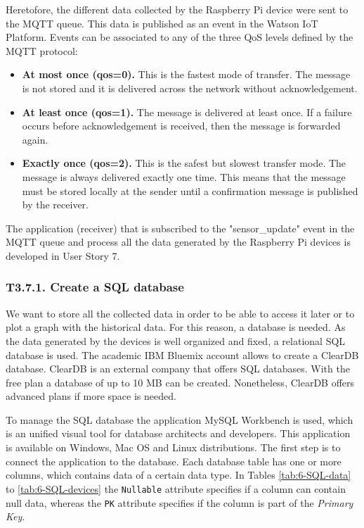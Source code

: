 Heretofore, the different data collected by the Raspberry Pi device were sent to the MQTT queue. This data is published as an event in the Watson \ac{IoT} Platform. Events can be associated to any of the three \ac{QoS} levels defined by the MQTT protocol:
\begin{itemize}
	\item \textbf{At most once (qos=0).} This is the fastest mode of transfer. The message is not stored and it is delivered across the network without acknowledgement.
	\item \textbf{At least once (qos=1).} The message is delivered at least once. If a failure occurs before acknowledgement is received, then the message is forwarded again.
	\item \textbf{Exactly once (qos=2).} This is the safest but slowest transfer mode. The message is always delivered exactly one time. This means that the message must be stored locally at the sender until a confirmation message is published by the receiver.
\end{itemize}

The application (receiver) that is subscribed to the "sensor\_update" event in the MQTT queue and process all the data generated by the Raspberry Pi devices is developed in User Story 7.


\subsubsection{T3.7.1. Create a SQL database}

We want to store all the collected data in order to be able to access it later or to plot a graph with the historical data. For this reason, a database is needed. As the data generated by the devices is well organized and fixed, a relational SQL database is used. The academic IBM Bluemix account allows to create a ClearDB database. ClearDB is an external company that offers SQL databases. With the free plan a database of up to 10 MB can be created. Nonetheless, ClearDB offers advanced plans if more space is needed.

To manage the SQL database the application MySQL Workbench is used, which is an unified visual tool for database architects and developers. This application is available on Windows, Mac OS and Linux distributions. The first step is to connect the application to the database. Each database table has one or more columns, which contains data of a certain data type. In Tables \ref{tab:6-SQL-data} to \ref{tab:6-SQL-devices} the \texttt{Nullable} attribute specifies if a column can contain null data, whereas the \texttt{PK} attribute specifies if the column is part of the \textit{Primary Key}.

